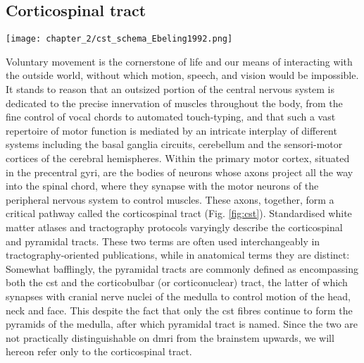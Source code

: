 \subsection{Corticospinal tract}

\begin{SCfigure}[][htb!]
  \texttt{[image: chapter\_2/cst\_schema\_Ebeling1992.png]}
  \caption{ Schematic of corticospinal tract, from \textcite{Ebeling1992}}
  \label{fig:cst}
\end{SCfigure}

Voluntary movement is the cornerstone of life and our means of interacting with the outside world, without which motion, speech, and vision would be impossible.
It stands to reason that an outsized portion of the central nervous system is dedicated to the precise innervation of muscles throughout the body, from the fine control of vocal chords to automated touch-typing, and that such a vast repertoire of motor function is mediated by an intricate interplay of different systems including the basal ganglia circuits, cerebellum and the sensori-motor cortices of the cerebral hemispheres.\autocite{Kandel2021}
Within the primary motor cortex, situated in the precentral gyri, are the bodies of neurons whose axons project all the way into the spinal chord, where they synapse with the motor neurons of the peripheral nervous system to control muscles.
These axons, together, form a critical pathway called the corticospinal tract (Fig. \ref{fig:cst}).
Standardised white matter atlases and tractography protocols varyingly describe the corticospinal and pyramidal tracts.
These two terms are often used interchangeably in tractography-oriented publications, while in anatomical terms they are distinct:
Somewhat bafflingly, the pyramidal tracts are commonly defined as encompassing both the \gls{cst} and the corticobulbar (or corticonuclear) tract, the latter of which synapses with cranial nerve nuclei of the medulla to control motion of the head, neck and face.\autocite{Chenot2019}
This despite the fact that only the \gls{cst} fibres continue to form the pyramids of the medulla, after which pyramidal tract is named.
Since the two are not practically distinguishable on \gls{dmri} from the brainstem upwards, we will hereon refer only to the corticospinal tract.%
%
